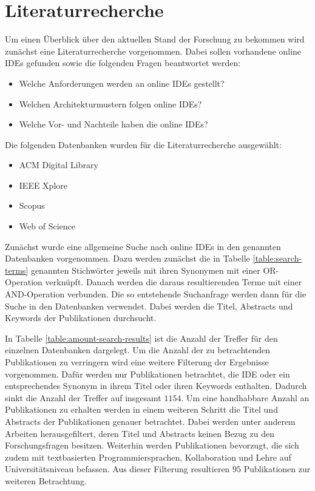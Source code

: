 \section{Literaturrecherche} \label{literaturrecherche}

Um einen Überblick über den aktuellen Stand der Forschung zu bekommen wird zunächst eine Literaturrecherche vorgenommen. Dabei sollen vorhandene online IDEs gefunden sowie die folgenden Fragen beantwortet werden:

\begin{itemize}
    \item Welche Anforderungen werden an online IDEs gestellt?
    \item Welchen Architekturmustern folgen online IDEs?
    \item Welche Vor- und Nachteile haben die online IDEs?
\end{itemize}

Die folgenden Datenbanken wurden für die Literaturrecherche ausgewählt:

\begin{itemize}
    \item ACM Digital Library
    \item IEEE Xplore
    \item Scopus
    \item Web of Science
\end{itemize}

Zunächst wurde eine allgemeine Suche nach online IDEs in den genannten Datenbanken vorgenommen. Dazu werden zunächst die in Tabelle \ref{table:search-terms} genannten Stichwörter jeweils mit ihren Synonymen mit einer OR-Operation verknüpft. Danach werden die daraus resultierenden Terme mit einer AND-Operation verbunden. Die so entstehende Suchanfrage werden dann für die Suche in den Datenbanken verwendet. Dabei werden die Titel, Abstracts und Keywords der Publikationen durchsucht.

In Tabelle \ref{table:amount-search-results} ist die Anzahl der Treffer für den einzelnen Datenbanken dargelegt. Um die Anzahl der zu betrachtenden Publikationen zu verringern wird eine weitere Filterung der Ergebnisse vorgenommen. Dafür werden nur Publikationen betrachtet, die IDE oder ein entsprechendes Synonym in ihrem Titel oder ihren Keywords enthalten. Dadurch sinkt die Anzahl der Treffer auf insgesamt $1154$. Um eine handhabbare Anzahl an Publikationen zu erhalten werden in einem weiteren Schritt die Titel und Abstracts der Publikationen genauer betrachtet. Dabei werden unter anderem Arbeiten herausgefiltert, deren Titel und Abstracts keinen Bezug zu den Forschungsfragen besitzen. Weiterhin werden Publikationen bevorzugt, die sich zudem mit textbasierten Programmiersprachen, Kollaboration und Lehre auf Universitätsniveau befassen. Aus dieser Filterung resultieren $95$ Publikationen zur weiteren Betrachtung. \\

